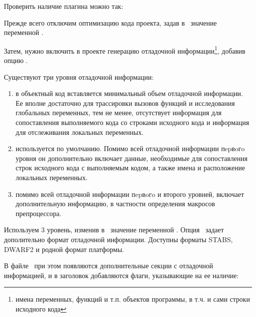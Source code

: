 \bigskip
Проверить наличие плагина можно так:





\bigskip

Прежде всего отключим оптимизацию кода проекта, задав в
\makefile\ значение переменной . 

Затем, нужно включить в проекте генерацию отладочной информации\footnote{имена
переменных, функций и т.п. объектов программы, в т.ч. и сами строки исходного
кода}, добавив опцию .

Существуют три уровня отладочной информации:

\begin{enumerate}
\item в объектный код вставляется минимальный объем отладочной информации. Ее
вполне достаточно для трассировки вызовов функций и исследования глобальных
переменных, тем не менее, отсутствует информация для сопоставления выполняемого
кода со строками исходного кода и информация для отслеживания локальных
переменных.

\item используется по умолчанию. Помимо всей отладочной информации пepвoгo
уровня он дополнительно включает данные, необходимые для сопоставления строк
исходного кода с выполняемым кодом, а также имена и расположение локальных
переменных.

\item помимо всей отладочной информации пepвoгo и второго уровней, включает
дополнительную информацию, в частности определения макросов препроцессора.
\end{enumerate}

Используем 3 уровень, изменив в \makefile\ значение переменной 
. Опция \ задает дополительно формат
отладочной информации. Доступны форматы STABS, DWARF2 и родной формат платформы.

В файле \ при этом появляются дополнительные секции
с отладочной информацией, и в заголовок добавляются флаги, указывающие на
ее наличие:

